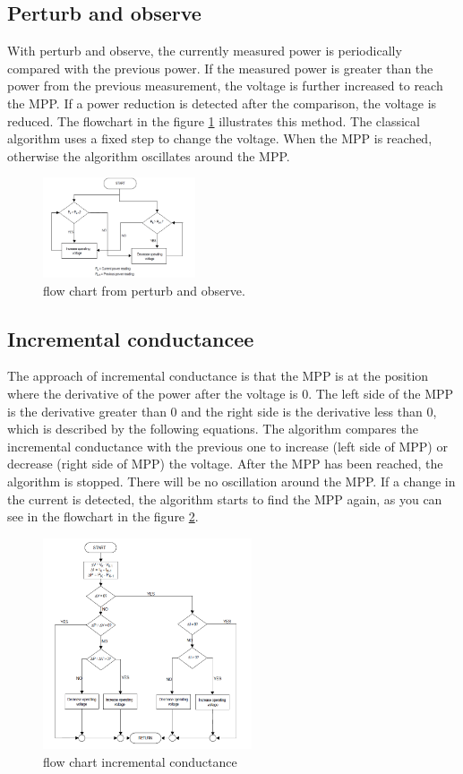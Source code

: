 \subsection{Perturb and observe}
With perturb and observe, the currently measured power is periodically compared with the previous power. If the measured power is greater than the power from the previous measurement, the voltage is further increased to reach the MPP. If a power reduction is detected after the comparison, the voltage is reduced. The flowchart in the figure \ref{fcperturbandobserve} illustrates this method. The classical algorithm uses a fixed step to change the voltage. When the MPP is reached, otherwise the algorithm oscillates around the MPP.

\begin{figure}[htbp]
	\begin{center}
		\includegraphics[width=0.4\textwidth]{../Pictures/P1/Flow_chart/flow_chart_perturb_observe}
		\caption{flow chart from perturb and observe.}
		\label{fcperturbandobserve}
	\end{center}	
\end{figure}

\subsection{Incremental conductancee}
The approach of incremental conductance is that the MPP is at the position where the derivative of the power after the voltage is 0. The left side of the MPP is the derivative greater than 0 and the right side is the derivative less than 0, which is described by the following equations. The algorithm compares the incremental conductance with the previous one to increase (left side of MPP) or decrease (right side of MPP) the voltage.  After the MPP has been reached, the algorithm is stopped. There will be no oscillation around the MPP. If a change in the current is detected, the algorithm starts to find the MPP again, as you can see in the flowchart in the figure \ref{fcinccon}.

\begin{figure}[htbp]
	\begin{center}
		\includegraphics[width=0.55\textwidth]{../Pictures/P1/Flow_chart/flow_chart_incremental_conductance}
		\caption{flow chart incremental conductance }
		\label{fcinccon}
	\end{center}	
\end{figure}